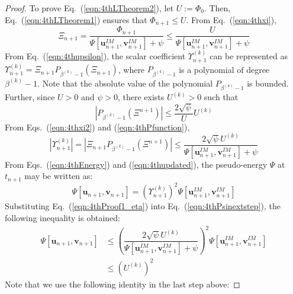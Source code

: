 \documentclass[10pt,a4paper]{amsart}
\begin{document}
\begin{proof}
  To prove Eq.~(\ref{eqn:4thLTheorem2}), let $U:=\Phi_0$.
  Then, Eq.~(\ref{eqn:4thLTheorem1}) ensures that $\Phi_{n+1} \le U$.
  From Eq.~(\ref{eqn:4thxi}),
  \begin{equation}
      \Xi_{n+1} = \dfrac{\Phi_{n+1}}{\Psi[\boldsymbol{u}_{n+1}^{IM},\boldsymbol{v}_{n+1}^{IM}]+\psi} \le \dfrac{U}{\Psi[\boldsymbol{u}_{n+1}^{IM},\boldsymbol{v}_{n+1}^{IM}]+\psi}
      \label{eqn:4thxi2}
  \end{equation}  
  From Eq.~(\ref{eqn:4thupsilon}), the scalar coefficient $\Upsilon^{(k)}_{n+1}$ can be represented as $\Upsilon^{(k)}_{n+1}=\Xi_{n+1} P_{\beta^{(k)}-1}(\Xi_{n+1})$, where $P_{\beta^{(k)}-1}$ is a polynomial of degree $\beta^{(k)}-1$.
  Note that the absolute value of the polynomial $P_{\beta^{(k)}-1}$ is bounded. 
  Further, since $U>0$ and $\psi>0$, there exists $U^{(k)}>0$ such that 
  \begin{equation}
      |P_{\beta^{(k)}-1}(\Xi^{n+1})| \le \dfrac{2\sqrt{\psi}}{U}U^{(k)}
      \label{eqn:4thPfunction}
  \end{equation} 
  From Eqs.~(\ref{eqn:4thxi2}) and (\ref{eqn:4thPfunction}), 
  \begin{equation}
      |\Upsilon^{(k)}_{n+1}|=|\Xi_{n+1} P_{\beta^{(k)}-1}(\Xi^{n+1})|\le \dfrac{2\sqrt{\psi}U^{(k)}}{\Psi[\boldsymbol{u}_{n+1}^{IM},\boldsymbol{v}_{n+1}^{IM}]+\psi}
      \label{eqn:4thProof1_eta}
  \end{equation}  
  From Eqs.~(\ref{eqn:4thEnergy}) and (\ref{eqn:4thupdated}), the pseudo-energy $\Psi$ at $t_{n+1}$ may be written as:
  \begin{equation}
       \Psi[\boldsymbol{u}_{n+1},\boldsymbol{v}_{n+1}] = \left(\Upsilon^{(k)}_{n+1}\right)^2 \Psi[\boldsymbol{u}_{n+1}^{IM},\boldsymbol{v}_{n+1}^{IM}] 
       \label{eqn:4thPsinextstep}
  \end{equation}
  Substituting Eq.~(\ref{eqn:4thProof1_eta}) into Eq.~(\ref{eqn:4thPsinextstep}), the following inequality is obtained:
  \begin{equation}
      \begin{array}{ll}
           \Psi[\boldsymbol{u}_{n+1},\boldsymbol{v}_{n+1}] 
           &\le \left(\dfrac{2\sqrt{\psi}U^{(k)}}{\Psi[\boldsymbol{u}_{n+1}^{IM},\boldsymbol{v}_{n+1}^{IM}]+\psi}\right)^2 \Psi[\boldsymbol{u}_{n+1}^{IM},\boldsymbol{v}_{n+1}^{IM}] \\
           &\le \left(U^{(k)}\right)^2
      \end{array}        
  \end{equation}
    Note that we use the following identity in the last step above:

\end{proof}
\end{document}

